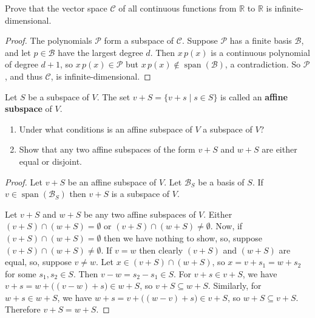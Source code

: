 \begin{tcolorbox}[title=Problem 15, breakable]
    Prove that the vector space $\mathcal{C}$ of all continuous functions from $\mathbb{R}$
    to $\mathbb{R}$ is infinite-dimensional.
\end{tcolorbox}

\begin{proof}
    The polynomials $\mathcal{P}$ form a subspace of $\mathcal{C}$.
    Suppose $\mathcal{P}$ has a finite basis $\mathcal{B}$, and let $p \in \mathcal{B}$
    have the largest degree $d$. Then $x\,p(x)$ is a continuous polynomial of degree $d+1$,
    so $x\,p(x) \in \mathcal{P}$ but $x\,p(x) \notin \operatorname{span}(\mathcal{B})$,
    a contradiction. So $\mathcal{P}$, and thus $\mathcal{C}$, is infinite-dimensional.
\end{proof}

\begin{tcolorbox}[title=Problem 17, breakable]
    Let $S$ be a subspace of $V$. The set $v + S = \{v + s \mid s \in S\}$ is called an
    \textbf{affine subspace} of $V$.
    \begin{enumerate}
        \item Under what conditions is an affine subspace of $V$ a subspace of $V$?
        \item Show that any two affine subspaces of the form $v + S$ and $w + S$ are
            either equal or disjoint.
    \end{enumerate}
\end{tcolorbox}

\begin{proof}
    Let $v + S$ be an affine subspace of $V$.
    Let $\mathcal{B}_S$ be a basis of $S$.
    If $v \in \operatorname{span}(\mathcal{B}_S)$ then $v + S$ is a subspace of $V$.

    Let $v + S$ and $w + S$ be any two affine subspaces of $V$.
    Either $(v + S) \cap (w + S) = \emptyset$  or $(v + S) \cap (w + S) \ne \emptyset$.
    Now, if $(v + S) \cap (w + S) = \emptyset$ then we have nothing to show, so,
    suppose $(v + S) \cap (w + S) \ne \emptyset$.
    If $v = w$ then clearly $(v + S)$ and $(w + S)$ are equal, so,
        suppose $v \ne w$.
    Let $x \in (v + S) \cap (w + S)$, so $x = v + s_1 = w + s_2$ for some $s_1, s_2 \in S$.
    Then $v - w = s_2 - s_1 \in S$.
    For $v + s \in v + S$, we have $v + s = w + \big((v - w) + s\big) \in w + S$,
    so $v + S \subseteq w + S$.
    Similarly, for $w + s \in w + S$, we have $w + s = v + \big((w - v) + s\big) \in v + S$,
    so $w + S \subseteq v + S$.
    Therefore $v + S = w + S$.
\end{proof}

